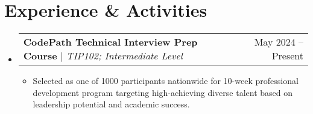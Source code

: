 \documentclass[letterpaper,11pt]{article}
\makeatletter
\newcommand{\resumeItem}[1]{
  \item\small{
    {#1 \vspace{-3pt}}
  }
}
\newcommand{\resumeSubheading}[4]{
  \vspace{-2pt}\item
    \begin{tabular*}{0.97\textwidth}[t]{l@{\extracolsep{\fill}}r@{\hspace{-0.2in}}}
        \textbf{#1} & #2 \\
        \textit{\small#3} & \textit{\small #4} \\
    \end{tabular*}\vspace{-1pt}
}
\newcommand{\resumeProjectHeading}[2]{
    \item
    \begin{tabular*}{0.97\textwidth}{l@{\extracolsep{\fill}}r@{\hspace{-0.2in}}}
        \small#1 & #2 \\
    \end{tabular*}\vspace{-7pt}
}
\newcommand{\resumeSubHeadingListStart}{\begin{itemize}[leftmargin=0.00in, rightmargin=-0.2in, label={}]}
\newcommand{\resumeSubHeadingListEnd}{\end{itemize}}
\newcommand{\resumeItemListStart}{\begin{itemize}[leftmargin=0.15in, rightmargin=0.15in]}
\newcommand{\resumeItemListEnd}{\end{itemize}\vspace{-3pt}}
\makeatother
\begin{document}






\section{Experience \& Activities}
    \resumeSubHeadingListStart
        \resumeProjectHeading
            {\textbf{CodePath Technical Interview Prep Course} $|$ \emph{TIP102; Intermediate Level}}{May 2024 -- Present}
            \resumeItemListStart
                \resumeItem{Selected as one of 1000 participants nationwide for 10-week professional development program targeting high-achieving diverse talent based on leadership potential and academic success.}
            \resumeItemListEnd
        \resumeSubHeadingListEnd
\end{document}

